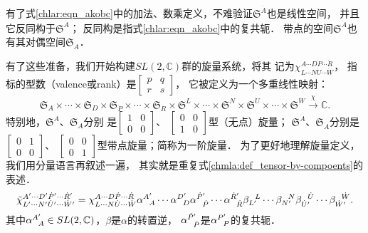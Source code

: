有了式\eqref{chlar:eqn_akobc}中的加法、数乘定义，不难验证$\mathfrak{S}^{\dot{A}}$也是线性空间，
并且它{\kaishu 反同构}于$\mathfrak{S}^{A}$；
反同构是指式\eqref{chlar:eqn_akobc}中的复共轭．
带点的空间$\mathfrak{S}^{\dot{A}}$也有其对偶空间$\mathfrak{S}_{\dot{A}}$．

有了这些准备，我们开始构建$SL(2,\mathbb{C})$群的{\heiti 旋量系统}，将其
记为$\chi^{A\cdots D \dot{P}\cdots \dot{R}}_{L\cdots N \dot{U}\cdots \dot{W}}$，
指标的型数（valence或rank）是$\left[\begin{smallmatrix} p & q \\ r & s \end{smallmatrix}\right]$，
它被定义为一个多重线性映射：  %
\begin{equation*}
\mathfrak{S}_A\times \cdots \times \mathfrak{S}_D\times
\mathfrak{S}_{\dot{P}} \times \cdots \times\mathfrak{S}_{\dot{R}} \times 
\mathfrak{S}^L\times \cdots \times \mathfrak{S}^N\times
\mathfrak{S}^{\dot{U}} \times \cdots \times\mathfrak{S}^{\dot{W}} 
\xrightarrow{\chi} \mathbb{C} .
\end{equation*}
特别地，$\mathfrak{S}^{A}$、$\mathfrak{S}_{A}$分别
是$\left[\begin{smallmatrix} 1 & 0 \\ 0&0 \end{smallmatrix}\right]$、
$\left[\begin{smallmatrix} 0 &0\\ 1&0 \end{smallmatrix}\right]$型（无点）旋量；
$\mathfrak{S}^{\dot{A}}$、$\mathfrak{S}_{\dot{A}}$分别是
$\left[\begin{smallmatrix} 0&1 \\ 0&0 \end{smallmatrix}\right]$、
$\left[\begin{smallmatrix} 0&0 \\ 0&1 \end{smallmatrix}\right]$型带点旋量；简称为一阶旋量．
为了更好地理解旋量定义，我们用分量语言再叙述一遍，
其实就是重复式\eqref{chmla:def_tensor-by-compoents}的表述．
\setlength{\mathindent}{-1em}
\begin{equation}\label{chlar:eqn_spin-comp}
    \tilde{\chi}^{A'\cdots D' \dot{P}'\cdots \dot{R}'}_{L'\cdots N' \dot{U}'\cdots \dot{W}'}
    =\chi^{A\cdots D \dot{P}\cdots \dot{R}}_{L\cdots N \dot{U}\cdots \dot{W}}
    \alpha_{\hphantom{A} A}^{A'} \cdots \alpha_{\hphantom{A} D}^{D'}
    \alpha_{\hphantom{A} \dot{P}}^{\dot{P}'} \cdots \alpha_{\hphantom{A} \dot{R}}^{\dot{R}'}
    \beta^{\hphantom{A} L}_{L'} \cdots \beta^{\hphantom{A} N}_{N'}
    \beta^{\hphantom{A} \dot{U}}_{\dot{U}'} \cdots \beta^{\hphantom{A} \dot{W}}_{\dot{W}'} .
\end{equation}\setlength{\mathindent}{2em}
其中$\alpha_{\hphantom{A} A}^{A'}\in SL(2,\mathbb{C})$，$\beta$是$\alpha$的转置逆，
$\alpha_{\hphantom{A} \dot{P}}^{\dot{P}'}$是$\alpha_{\hphantom{A} {P}}^{{P}'}$的复共轭．

